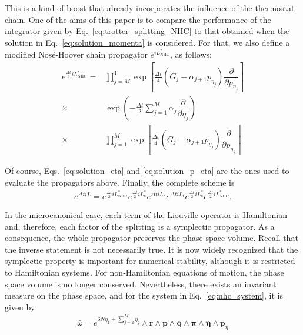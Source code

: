 \documentclass[aip,jcp,reprint,amsmath,amssymb,raggedbottom]{revtex4-1}
\newcommand{\vt}[1]{\boldsymbol{\mathbf{#1}}}           %
\newcommand{\diff}[2]{\dfrac{\partial #1}{\partial #2}} %
\begin{document}
This is a kind of boost that already incorporates the influence of the thermostat chain. One of the aims of this paper is to compare the performance of the integrator given by Eq.~\ref{eq:trotter_splitting_NHC} to that obtained when the solution in Eq.~\ref{eq:solution_momenta} is considered. For that, we also define a modified Nos\'e-Hoover chain propagator $e^{i\!L^\ast_\text{NHC}}$, as follows:
\begin{equation}
\begin{split}
e^{\frac{\Delta t}{2} i\!L_\text{NHC}^\ast } = &\prod_{j=M}^1 \exp\left[\frac{\Delta t}{4} \left( G_j - \alpha_{j+1} p_{\eta_j} \right) \diff{}{p_{\eta_j}}\right] \\
\times &\exp\left(-\frac{\Delta t}{2} \sum_{j=1}^M \alpha_j \diff{}{\eta_j}\right) \\
\times &\prod_{j=1}^M \exp\left[\frac{\Delta t}{4} \left( G_j - \alpha_{j+1} p_{\eta_j} \right) \diff{}{p_{\eta_j}}\right]
\end{split}
\end{equation}

Of course, Eqs.~\ref{eq:solution_eta} and \ref{eq:solution_p_eta} are the ones used to evaluate the propagators above. Finally, the complete scheme is
\begin{equation}
\label{eq:modified_splitting}
\begin{split}
e^{\Delta t i\!L} = e^{\frac{\Delta t}{2} i\!L_\text{NHC}^\ast} e^{\frac{\Delta t}{2} i\!L_b^\ast} e^{\Delta t i\!L_r} e^{\Delta t i\!L_t}  e^{\frac{\Delta t}{2} i\!L_b^\ast} e^{\frac{\Delta t}{2} i\!L_\text{NHC}^\ast}.
\end{split}
\end{equation}

In the microcanonical case, each term of the Liouville operator is Hamiltonian and, therefore, each factor of the splitting is a symplectic propagator. As a consequence, the whole propagator preserves the phase-space volume. Recall that the inverse statement is not necessarily true. It is now widely recognized that the symplectic property is important for numerical stability,\cite{Skeel1997} although it is restricted to Hamiltonian systems. For non-Hamiltonian equations of motion, the phase space volume is no longer conserved. Nevertheless, there exists an invariant measure on the phase space, and for the system in Eq.~\ref{eq:nhc_system}, it is given by
\begin{align*}
\bar{\omega} = e^{6N \eta_1 + \sum_{j=2}^M \eta_j} \wedge {\vt r} \wedge {\vt p} \wedge {\vt q} \wedge {\vt \pi} \wedge {\vt \eta} \wedge {\vt p_\eta}
\end{align*}
\end{document}
